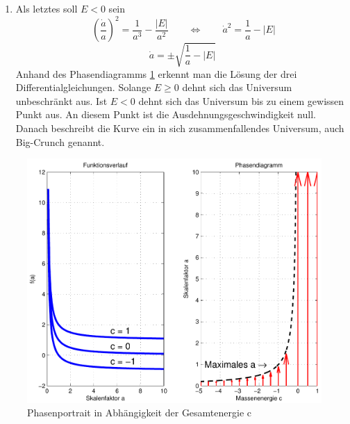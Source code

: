 \begin{refsection}
\begin{enumerate}
	\item Als letztes soll $E < 0$ sein
	\[\ \left(\frac{\dot{a}}{a} \right)^2 = \frac{1}{a^3} - \frac{|E|}{a^2} \qquad \Leftrightarrow \qquad \dot{a}^2 = \frac{1}{a} - |E|\]
	\begin{equation}
	\dot{a} = \pm \sqrt{\frac{1}{a} - |E|}
	\end{equation}
	Anhand des Phasendiagramms \ref{friedmann:phasenportrait} erkennt man die Lösung der drei Differentialgleichungen. Solange $E \geq 0$ dehnt sich das Universum unbeschränkt aus. Ist $E < 0$ dehnt sich das Universum bis zu einem gewissen Punkt aus. An diesem Punkt ist die Ausdehnungsgeschwindigkeit null. Danach beschreibt die Kurve ein in sich zusammenfallendes Universum, auch Big-Crunch genannt.
	
\end{enumerate}

\begin{figure}[h]
	\centering
	\includegraphics[width  = \textwidth]{friedmann/images/phasendiagramm.pdf}
	\caption{Phasenportrait in Abhängigkeit der Gesamtenergie c
		\label{friedmann:phasenportrait}}
\end{figure}%

%
	


\end{refsection}
